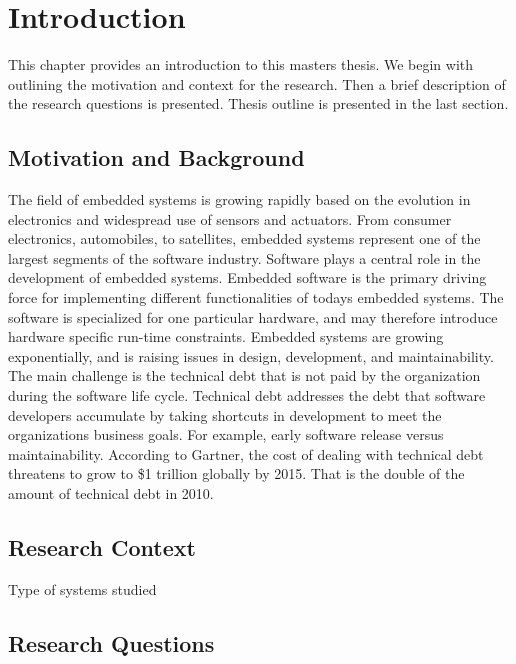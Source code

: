 
\chapter{Introduction}

This chapter provides an introduction to this masters thesis. We begin with outlining the motivation and context for the research. Then a brief description of the research questions is presented. Thesis outline is presented in the last section.


\section{Motivation and Background}
The field of embedded systems is growing rapidly based on the evolution in electronics and widespread use of sensors and actuators. From consumer electronics, automobiles, to satellites, embedded systems represent one of the largest segments of the software industry. Software plays a central role in the development of embedded systems. Embedded software is the primary driving force for implementing different functionalities of todays embedded systems. The software is specialized for one particular hardware, and may therefore introduce hardware specific run-time constraints. Embedded systems are growing exponentially\cite{graaf2003embedded}, and is raising issues in design, development, and maintainability. The main challenge is the technical debt that is not paid by the organization during the software life cycle. Technical debt addresses the debt that software developers accumulate by taking shortcuts in development to meet the organizations business goals. For example, early software release versus maintainability. According to Gartner\cite{gartner2010}, the cost of dealing with technical debt threatens to grow to \$1 trillion globally by 2015. That is the double of the amount of technical debt in 2010. 



\section{Research Context}
Type of systems studied


\section{Research Questions}

